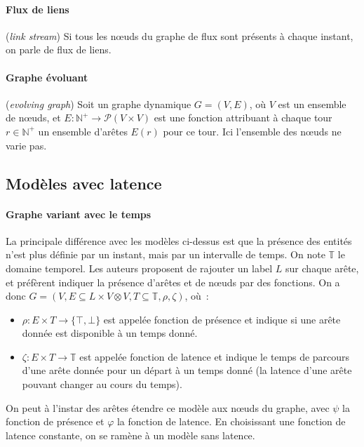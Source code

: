 \documentclass[12pt,a4paper]{article}
\begin{document}
\paragraph{Flux de liens} (\textit{link stream}) Si tous les nœuds du
graphe de flux sont présents à chaque instant, on parle de flux de
liens.

\paragraph{Graphe évoluant}\cite{kuhn2011dynamic} (\textit{evolving
  graph}) Soit un graphe dynamique \(G = (V, E)\), où \(V\) est un
ensemble de nœuds, et
\(E : \mathbb{N}^{+} \to \mathcal{P}(V \times V)\) est une fonction
attribuant à chaque tour \(r \in \mathbb{N}^{+}\) un ensemble d'arêtes
\(E(r)\) pour ce tour. Ici l'ensemble des nœuds ne varie pas.

\subsection{Modèles avec latence}

\paragraph{Graphe variant avec le temps}\cite{casteigts2012time} La
principale différence avec les modèles ci-dessus est que la présence
des entités n'est plus définie par un instant, mais par un intervalle
de temps. On note \(\mathbb{T}\) le domaine temporel. Les auteurs
proposent de rajouter un label \(L\) sur chaque arête, et préfèrent
indiquer la présence d'arêtes et de nœuds par des fonctions. On a donc
\(G = (V, E \subseteq L \times V \otimes V, T \subseteq \mathbb{T},
\rho, \zeta)\), où~:
\begin{itemize}
\item \(\rho : E \times T \to \{\top, \bot\}\) est appelée fonction
  de présence et indique si une arête donnée est disponible à un temps
  donné.
\item \(\zeta : E \times T \to \mathbb{T}\) est appelée fonction de
  latence et indique le temps de parcours d'une arête donnée pour un
  départ à un temps donné (la latence d'une arête pouvant changer au
  cours du temps).
\end{itemize}

On peut à l'instar des arêtes étendre ce modèle aux nœuds du graphe,
avec \(\psi\) la fonction de présence et \(\varphi\) la fonction de
latence. En choisissant une fonction de latence constante, on se
ramène à un modèle sans latence.
\end{document}
